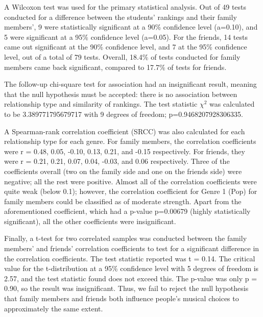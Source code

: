 \documentclass[12pt]{report}
\begin{document}
A Wilcoxon test was used for the primary statistical analysis. Out of 49 tests conducted for a difference between the students' rankings and their family members', 9 were statistically significant at a 90\% confidence level (a=0.10), and 5 were significant at a 95\% confidence level (a=0.05). For the friends, 14 tests came out significant at the 90\% confidence level, and 7 at the 95\% confidence level, out of a total of 79 tests. Overall, 18.4\% of tests conducted for family members came back significant, compared to 17.7\% of tests for friends.

The follow-up chi-square test for association had an insignificant result, meaning that the null hypothesis must be accepted: there is no association between relationship type and similarity of rankings. The test statistic $\chi^2$ was calculated to be 3.389771795679717 with 9 degrees of freedom; p=0.9468207928306335.

A Spearman-rank correlation coefficient (SRCC) was also calculated for each relationship type for each genre. For family members, the correlation coefficients were r = 0.48, 0.05, -0.10, 0.13, 0.21, and -0.15 respectively. For friends, they were r = 0.21, 0.21, 0.07, 0.04, -0.03, and 0.06 respectively. Three of the coefficients overall (two on the family side and one on the friends side) were negative; all the rest were positive. Almost all of the correlation coefficients were quite weak (below 0.1); however, the correlation coefficient for Genre 1 (Pop) for family members could be classified as of moderate strength. Apart from the aforementioned coefficient, which had a p-value p=0.00679 (highly statistically significant), all the other coefficients were insignificant.

Finally, a t-test for two correlated samples was conducted between the family members' and friends' correlation coefficients to test for a significant difference in the correlation coefficients. The test statistic reported was t = 0.14. The critical value for the t-distribution at a 95\% confidence level with 5 degrees of freedom is 2.57, and the test statistic found does not exceed this. The p-value was only p = 0.90, so the result was insignificant. Thus, we fail to reject the null hypothesis that family members and friends both influence people's musical choices to approximately the same extent.

\end{document}
